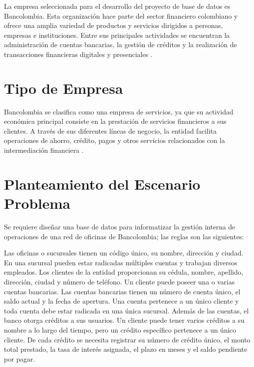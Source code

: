 \documentclass[stu,12pt,floatsintext]{apa7}
\begin{document}
La empresa seleccionada para el desarrollo del proyecto de base de datos es Bancolombia. Esta organización hace parte del sector financiero colombiano y ofrece una amplia variedad de productos y servicios dirigidos a personas, empresas e instituciones. Entre sus principales actividades se encuentran la administración de cuentas bancarias, la gestión de créditos y la realización de transacciones financieras digitales y presenciales \parencite{Bancolombia2026}.

\section{Tipo de Empresa}

Bancolombia se clasifica como una empresa de servicios, ya que su actividad económica principal consiste en la prestación de servicios financieros a sus clientes. A través de sus diferentes líneas de negocio, la entidad facilita operaciones de ahorro, crédito, pagos y otros servicios relacionados con la intermediación financiera \parencite{Bancolombia2026}.

\section{Planteamiento del Escenario Problema}

Se requiere diseñar una base de datos para informatizar la gestión interna de operaciones de una red de oficinas de Bancolombia; las reglas son las siguientes:

Las oficinas o sucursales tienen un código único, su nombre, dirección y ciudad. En una sucursal pueden estar radicadas múltiples cuentas y trabajan diversos empleados. Los clientes de la entidad proporcionan su cédula, nombre, apellido, dirección, ciudad y número de teléfono. Un cliente puede poseer una o varias cuentas bancarias. Las cuentas bancarias tienen un número de cuenta único, el saldo actual y la fecha de apertura. Una cuenta pertenece a un único cliente y toda cuenta debe estar radicada en una única sucursal. Además de las cuentas, el banco otorga créditos a sus usuarios. Un cliente puede tener varios créditos a su nombre a lo largo del tiempo, pero un crédito específico pertenece a un único cliente. De cada crédito se necesita registrar su número de crédito único, el monto total prestado, la tasa de interés asignada, el plazo en meses y el saldo pendiente por pagar.
\end{document}
